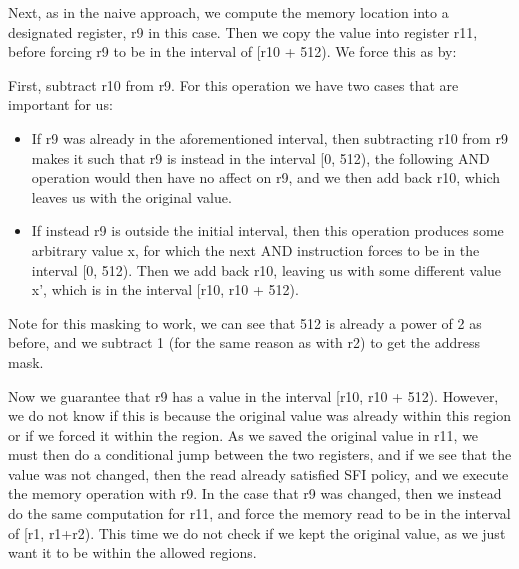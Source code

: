 Next, as in the naive approach, we compute the memory location into a
designated register, r9 in this case. Then we copy the value into register r11,
before forcing r9 to be in the interval of [r10 + 512). We force this as by:

First, subtract r10 from r9. For this operation we have two cases that are
important for us: 
\begin{itemize}
  \item If r9 was already in the aforementioned interval, then subtracting r10
    from r9 makes it such that r9 is instead in the interval [0, 512), the
    following AND operation would then have no affect on r9, and we then add
    back r10, which leaves us with the original value.
  \item If instead r9 is outside the initial interval, then this operation
    produces some arbitrary value x, for which the next AND instruction forces
    to be in the interval [0, 512). Then we add back r10, leaving us with some
    different value x', which is in the interval [r10, r10 + 512).
\end{itemize}

Note for this masking to work, we can see that 512 is already a power of 2 as
before, and we subtract 1 (for the same reason as with r2) to get the address
mask.

Now we guarantee that r9 has a value in the interval [r10, r10 + 512). However,
we do not know if this is because the original value was already within this
region or if we forced it within the region. As we saved the original value in
r11, we must then do a conditional jump between the two registers, and if we
see that the value was not changed, then the read already satisfied SFI policy,
and we execute the memory operation with r9. In the case that r9 was changed,
then we instead do the same computation for r11, and force the memory read to
be in the interval of [r1, r1+r2). This time we do not check if we kept the
original value, as we just want it to be within the allowed regions.
